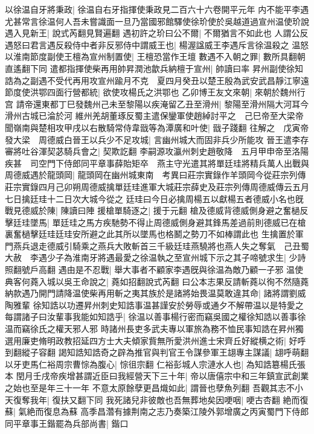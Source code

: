 以徐温自牙將秉政|{
	徐温自右牙指揮使秉政見二百六十六卷開平元年}
内不能平李遇尤甚常言徐温何人吾未嘗識面一旦乃當國邪館驛使徐玠使於吳越道過宣州温使玠說遇入見新王|{
	說式芮翻見賢遍翻}
遇初許之玠曰公不爾|{
	不爾猶言不如此也}
人謂公反遇怒曰君言遇反殺侍中者非反邪侍中謂威王也|{
	楊渥諡威王李遇斥言徐温殺之}
温怒以淮南節度副使王檀為宣州制置使|{
	王檀恐當作王壇}
數遇不入朝之罪|{
	數所具翻朝直遙翻下同}
遣都指揮使柴再用帥昇潤池歙兵納檀于宣州|{
	帥讀曰率}
昇州副使徐知誥為之副遇不受代再用攻宣州踰月不克　夏四月癸丑以楚王殷為武安武昌靜江寧遠節度使洪鄂四面行營都統|{
	欲使攻楊氏之洪鄂也}
乙卯博王友文來朝|{
	來朝於魏州行宫}
請帝還東都丁巳發魏州己未至黎陽以疾淹留乙丑至滑州|{
	黎陽至滑州隔大河耳今滑州古城已淪於河}
維州羌胡董琢反蜀主遣保鑾軍使趙綽討平之　己巳帝至大梁帝聞嶺南與楚相攻甲戌以右散騎常侍韋戩等為潭廣和叶使|{
	戩子踐翻}
往解之　戊寅帝發大梁　周德威白晉王以兵少不足攻城|{
	言幽州城大而固非兵少所能攻}
晉王遣李存審將吐谷渾契苾騎兵會之|{
	契欺訖翻}
李嗣源攻瀛州刺史趙敬降　五月甲申帝至洛陽疾甚　司空門下侍郎同平章事薛貽矩卒　燕主守光遣其將單廷珪將精兵萬人出戰與周德威遇於龍頭岡|{
	龍頭岡在幽州城東南　考異曰莊宗實錄作羊頭岡今從莊宗列傳莊宗實錄四月己卯朔周德威擒單廷珪進軍大城莊宗薛史及莊宗列傳周德威傳云五月七日擒廷珪十二日次大城今從之}
廷珪曰今日必擒周楊五以獻楊五者德威小名也旣戰見德威於陳|{
	陳讀曰陣}
援槍單騎逐之|{
	援于元翻}
槍及德威背德威側身避之奮檛反擊廷珪墜馬|{
	單廷珪之馬方疾馳勢不得止周德威側身避其鋒馬差過前則德威已在槍裏奮檛擊廷珪廷珪安所避之此其所以墜馬也格鬭之勢刀不如棒謂此也}
生擒置於軍門燕兵退走德威引騎乘之燕兵大敗斬首三千級廷珪燕驍將也燕人失之奪氣　己丑蜀大赦　李遇少子為淮南牙將遇最愛之徐温執之至宣州城下示之其子啼號求生|{
	少詩照翻號戶高翻}
遇由是不忍戰|{
	舉大事者不顧家李遇旣與徐温為敵乃顧一子邪}
温使典客何蕘入城以吳王命說之|{
	蕘如招翻說式芮翻}
曰公本志果反請斬蕘以徇不然隨蕘納款遇乃開門請降温使柴再用斬之夷其族於是諸將始畏温莫敢違其命|{
	諸將謂劉威陶雅輩}
徐知誥以功遷昇州刺史知誥事温甚謹安於勞辱或通夕不解帶温以是特愛之每謂諸子曰汝輩事我能如知誥乎|{
	徐温以善事楊行密而竊吳國之權徐知誥以善事徐温而竊徐氏之權天邪人邪}
時諸州長吏多武夫專以軍旅為務不恤民事知誥在昇州獨選用廉吏脩明政教招延四方士大夫傾家貲無所愛洪州進士宋齊丘好縱横之術|{
	好呼到翻縱子容翻}
謁知誥知誥奇之辟為推官與判官王令謀參軍王翃專主謀議|{
	翃呼萌翻}
以牙吏馬仁裕周宗曹悰為腹心|{
	悰徂宗翻}
仁裕彭城人宗漣水人也|{
	為知誥簒楊氏張本}
閏月壬戌帝疾增甚謂近臣曰我經營天下三十年|{
	帝以唐僖宗中和三年鎮宣武創業之始也至是年三十一年}
不意太原餘孽更昌熾如此|{
	謂晉也孽魚列翻}
吾觀其志不小天復奪我年|{
	復扶又翻下同}
我死諸兒非彼敵也吾無葬地矣因哽咽|{
	哽古杏翻}
絶而復蘇|{
	氣絶而復息為蘇}
高季昌濳有據荆南之志乃奏築江陵外郭增廣之丙寅蜀門下侍郎同平章事王鍇罷為兵部尚書|{
	鍇口}


